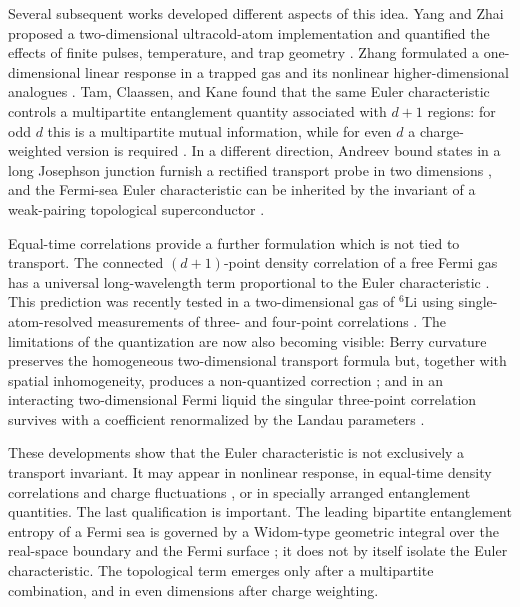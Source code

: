 \documentclass[a4paper,10pt]{article}
\numberwithin{equation}{section}
\theoremstyle{plain}
\theoremstyle{plain}
\theoremstyle{plain}
\theoremstyle{plain}
\theoremstyle{plain}
\theoremstyle{remark}
\theoremstyle{definition}
\theoremstyle{plain}
\begin{document}
    Several subsequent works developed different aspects of this idea. Yang
    and Zhai proposed a two-dimensional ultracold-atom implementation and
    quantified the effects of finite pulses, temperature, and trap geometry
    \cite{YangZhai2022}. Zhang formulated a one-dimensional linear response in
    a trapped gas and its nonlinear higher-dimensional analogues
    \cite{Zhang2023}. Tam, Claassen, and Kane found that the same Euler
    characteristic controls a multipartite entanglement quantity associated
    with $d+1$ regions: for odd $d$ this is a multipartite mutual information,
    while for even $d$ a charge-weighted version is required
    \cite{TamClaassenKane2022}. In a different direction, Andreev bound states
    in a long Josephson junction furnish a rectified transport probe in two
    dimensions \cite{TamKane2023Andreev,TamDeBeuleKane2023}, and the Fermi-sea
    Euler characteristic can be inherited by the invariant of a weak-pairing
    topological superconductor \cite{YangLiLi2023,Jia2025}.

    Equal-time correlations provide a further formulation which is not tied
    to transport. The connected $(d+1)$-point density correlation of a free
    Fermi gas has a universal long-wavelength term proportional to the Euler
    characteristic \cite{TamKane2024}. This prediction was recently tested in
    a two-dimensional gas of ${}^{6}\mathrm{Li}$ using single-atom-resolved
    measurements of three- and four-point correlations
    \cite{DaixEtAl2025}. The limitations of the quantization are now also
    becoming visible: Berry curvature preserves the homogeneous
    two-dimensional transport formula but, together with spatial
    inhomogeneity, produces a non-quantized correction \cite{YangLi2026}; and
    in an interacting two-dimensional Fermi liquid the singular three-point
    correlation survives with a coefficient renormalized by the Landau
    parameters \cite{TamKane2026,Kane2026ThreePoint}.

    These developments show that the Euler characteristic is not exclusively
    a transport invariant. It may appear in nonlinear response, in equal-time
    density correlations and charge fluctuations \cite{TamEtAl2026ChargeFluctuations}, or in specially arranged entanglement quantities.
    The last qualification is important. The leading bipartite entanglement
    entropy of a Fermi sea is governed by a Widom-type geometric integral over
    the real-space boundary and the Fermi surface
    \cite{GioevKlich2006}; it does not by itself isolate the Euler
    characteristic. The topological term emerges only after a multipartite
    combination, and in even dimensions after charge weighting.
\end{document}
